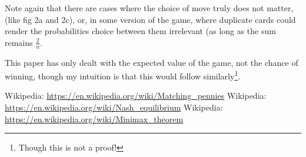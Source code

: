 \documentclass[11pt, oneside]{article} 	%
\begin{document}
Note again that there are cases where the choice of move truly does not matter, (like fig 2a and 2c), or, in some version of the game, where duplicate cards could render the probabilities choice between them irrelevant (as long as the sum remains $\frac{2}{n}$.

This paper has only dealt with the expected value of the game, not the chance of winning, though my intuition is that this would follow similarly\footnote{Though this is not a proof!}.


\begin{thebibliography}{9}
 Wikipedia: \url{https://en.wikipedia.org/wiki/Matching_pennies}
 Wikipedia: \url{https://en.wikipedia.org/wiki/Nash_equilibrium}
 Wikipedia: \url{https://en.wikipedia.org/wiki/Minimax_theorem}
\end{thebibliography}
\end{document}
